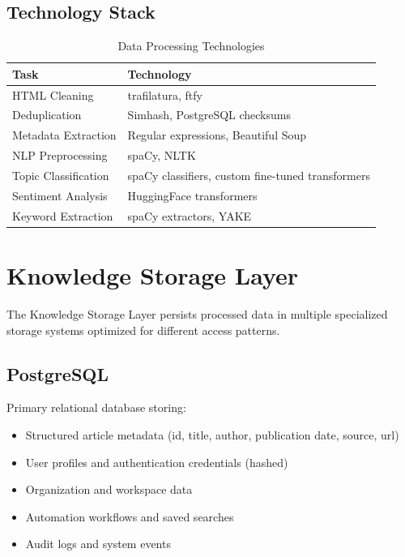 \documentclass[12pt,a4paper]{report}
\begin{document}
\subsection{Technology Stack}

\begin{table}[H]
\centering
\small
\begin{tabular}{|l|l|}
\hline
\textbf{Task} & \textbf{Technology} \\
\hline
HTML Cleaning & trafilatura, ftfy \\
Deduplication & Simhash, PostgreSQL checksums \\
Metadata Extraction & Regular expressions, Beautiful Soup \\
NLP Preprocessing & spaCy, NLTK \\
Topic Classification & spaCy classifiers, custom fine-tuned transformers \\
Sentiment Analysis & HuggingFace transformers \\
Keyword Extraction & spaCy extractors, YAKE \\
\hline
\end{tabular}
\caption{Data Processing Technologies}
\end{table}

\section{Knowledge Storage Layer}

The Knowledge Storage Layer persists processed data in multiple specialized storage systems optimized for different access patterns.

\subsection{PostgreSQL}

Primary relational database storing:

\begin{itemize}[label=\textbullet]
    \item Structured article metadata (id, title, author, publication date, source, url)
    \item User profiles and authentication credentials (hashed)
    \item Organization and workspace data
    \item Automation workflows and saved searches
    \item Audit logs and system events
\end{itemize}
\end{document}
